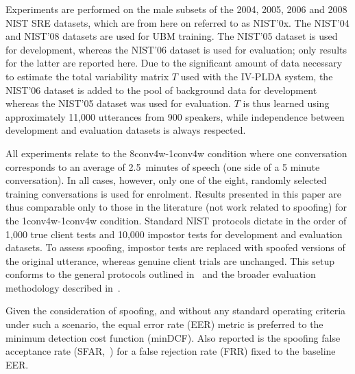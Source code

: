 
Experiments are performed on the male subsets of the 2004, 2005, 2006 and 2008 NIST SRE datasets, which are from here on referred to as NIST'0x.  
The NIST'04 and NIST'08 datasets are used for UBM training.
The NIST'05 dataset is used for development, whereas the NIST'06 dataset is used for evaluation;  
only results for the latter are reported here.
Due to the significant amount of data necessary to estimate the total variability matrix $T$ used with the IV-PLDA system, the NIST'06 dataset is added to the pool of background data for development whereas the NIST'05 dataset was used for evaluation. 
$T$ is thus learned using approximately 11,000 utterances from 900 speakers, while independence between development and evaluation datasets is always respected.
 
All experiments relate to the 8conv4w-1conv4w condition where one conversation corresponds to an average of 2.5~minutes of speech (one side of a 5 minute conversation).  
In all cases, however, only one of the eight, randomly selected training conversations is used for enrolment.
Results presented in this paper are thus comparable only to those in the literature (not work related to spoofing) for the 1conv4w-1conv4w condition. 
Standard NIST protocols dictate in the order of 1,000 true client tests and 10,000 impostor tests for development and evaluation datasets. 
To assess spoofing, impostor tests are replaced with spoofed versions of the original utterance, whereas genuine client trials are unchanged.
This setup conforms to the general protocols outlined in~\cite{Wu2014a} and the broader evaluation methodology described in~\cite{Hadid2015}.

Given the consideration of spoofing, and without any standard operating criteria under such a scenario, the equal error rate (EER) metric is preferred to the minimum detection cost function (minDCF).  Also reported is the spoofing false acceptance rate (SFAR,~\cite{Johnson2010}) for a false rejection rate (FRR) fixed to the baseline EER.
